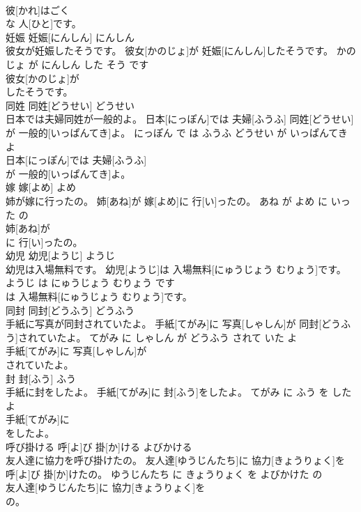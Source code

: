 \documentclass[8pt]{extreport}
\begin{document}
\begin{CJK}{UTF8}{min}
\\	彼[かれ]はごく
\\	な 人[ひと]です。			
\\	妊娠	妊娠[にんしん]	にんしん	
\\	彼女が妊娠したそうです。	彼女[かのじょ]が 妊娠[にんしん]したそうです。	かのじょ が にんしん した そう です	
\\	彼女[かのじょ]が
\\	したそうです。			
\\	同姓	同姓[どうせい]	どうせい	
\\	日本では夫婦同姓が一般的よ。	日本[にっぽん]では 夫婦[ふうふ] 同姓[どうせい]が 一般的[いっぱんてき]よ。	にっぽん で は ふうふ どうせい が いっぱんてき よ	
\\	日本[にっぽん]では 夫婦[ふうふ]
\\	が 一般的[いっぱんてき]よ。			
\\	嫁	嫁[よめ]	よめ	
\\	姉が嫁に行ったの。	姉[あね]が 嫁[よめ]に 行[い]ったの。	あね が よめ に いった の	
\\	姉[あね]が
\\	に 行[い]ったの。			
\\	幼児	幼児[ようじ]	ようじ	
\\	幼児は入場無料です。	幼児[ようじ]は 入場無料[にゅうじょう むりょう]です。	ようじ は にゅうじょう むりょう です	
\\	は 入場無料[にゅうじょう むりょう]です。			
\\	同封	同封[どうふう]	どうふう	
\\	手紙に写真が同封されていたよ。	手紙[てがみ]に 写真[しゃしん]が 同封[どうふう]されていたよ。	てがみ に しゃしん が どうふう されて いた よ	
\\	手紙[てがみ]に 写真[しゃしん]が
\\	されていたよ。			
\\	封	封[ふう]	ふう	
\\	手紙に封をしたよ。	手紙[てがみ]に 封[ふう]をしたよ。	てがみ に ふう を した よ	
\\	手紙[てがみ]に
\\	をしたよ。			
\\	呼び掛ける	呼[よ]び 掛[か]ける	よびかける	
\\	友人達に協力を呼び掛けたの。	友人達[ゆうじんたち]に 協力[きょうりょく]を 呼[よ]び 掛[か]けたの。	ゆうじんたち に きょうりょく を よびかけた の	
\\	友人達[ゆうじんたち]に 協力[きょうりょく]を
\\	の。			

\end{CJK}
\end{document}
